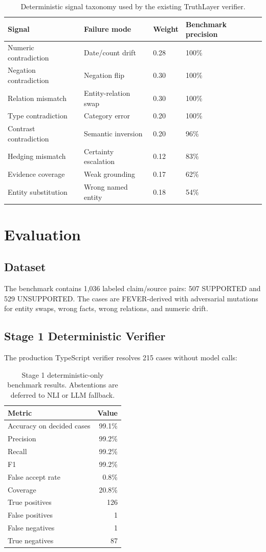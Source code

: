 \documentclass[11pt]{article}
\begin{document}
\begin{table}[h]
\centering
\begin{tabular}{llll}
\toprule
Signal & Failure mode & Weight & Benchmark precision \\
\midrule
Numeric contradiction & Date/count drift & 0.28 & 100\% \\
Negation contradiction & Negation flip & 0.30 & 100\% \\
Relation mismatch & Entity-relation swap & 0.30 & 100\% \\
Type contradiction & Category error & 0.20 & 100\% \\
Contrast contradiction & Semantic inversion & 0.20 & 96\% \\
Hedging mismatch & Certainty escalation & 0.12 & 83\% \\
Evidence coverage & Weak grounding & 0.17 & 62\% \\
Entity substitution & Wrong named entity & 0.18 & 54\% \\
\bottomrule
\end{tabular}
\caption{Deterministic signal taxonomy used by the existing TruthLayer verifier.}
\end{table}

\section{Evaluation}
\subsection{Dataset}
The benchmark contains 1,036 labeled claim/source pairs: 507 SUPPORTED and 529 UNSUPPORTED. The cases are FEVER-derived with adversarial mutations for entity swaps, wrong facts, wrong relations, and numeric drift.

\subsection{Stage 1 Deterministic Verifier}
The production TypeScript verifier resolves 215 cases without model calls:

\begin{table}[h]
\centering
\begin{tabular}{lr}
\toprule
Metric & Value \\
\midrule
Accuracy on decided cases & 99.1\% \\
Precision & 99.2\% \\
Recall & 99.2\% \\
F1 & 99.2\% \\
False accept rate & 0.8\% \\
Coverage & 20.8\% \\
True positives & 126 \\
False positives & 1 \\
False negatives & 1 \\
True negatives & 87 \\
\bottomrule
\end{tabular}
\caption{Stage 1 deterministic-only benchmark results. Abstentions are deferred to NLI or LLM fallback.}
\end{table}
\end{document}
